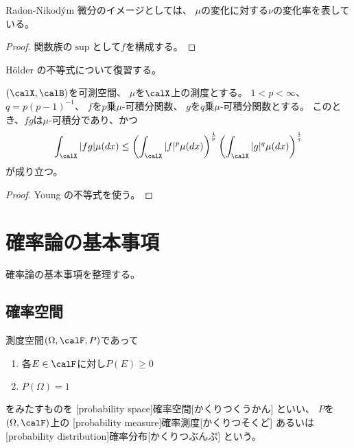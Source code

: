 \documentclass[report]{jlreq}
\begin{document}
Radon-Nikod\'ym 微分のイメージとしては、
$\mu$の変化に対する$\nu$の変化率を表している。

\begin{proof}
    関数族の$\sup$として$f$を構成する。
\end{proof}

H\"older の不等式について復習する。

\begin{proposition}
    $(\calX, \calB)$を可測空間、
    $\mu$を$\calX$上の測度とする。
    $1 < p < \infty$、$q = p(p - 1)^{-1}$、
    $f$を$p$乗$\mu$-可積分関数、
    $g$を$q$乗$\mu$-可積分関数とする。
    このとき、$fg$は$\mu$-可積分であり、かつ
    \begin{equation}
        \int_\calX |fg| \mu(dx)
            \le \myparen{
                \int_\calX |f|^{p} \mu(dx)
            }^{\frac{1}{p}}
            \myparen{
                \int_\calX |g|^{q} \mu(dx)
            }^{\frac{1}{q}}
    \end{equation}
    が成り立つ。
\end{proposition}

\begin{proof}
    Young の不等式を使う。
\end{proof}

%
\section{確率論の基本事項}

確率論の基本事項を整理する。

\subsection{確率空間}

\begin{definition}[確率空間]
    測度空間$(\Omega, \calF, P)$であって
    \begin{enumerate}
        \item 各$E \in \calF$に対し$P(E) \ge 0$
        \item $P(\Omega) = 1$
    \end{enumerate}
    をみたすものを
    [probability space]{確率空間}[かくりつくうかん]
    といい、
    $P$を$(\Omega, \calF)$上の
    [probability measure]{確率測度}[かくりつそくど]
    あるいは
    [probability distribution]{確率分布}[かくりつぶんぷ]
    という。
\end{definition}
\end{document}
